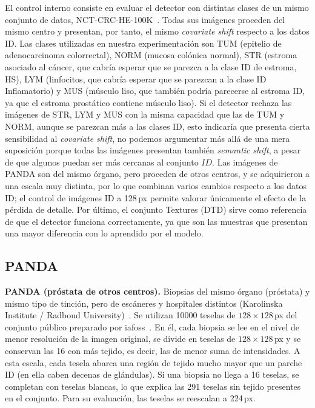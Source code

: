 El control interno consiste en evaluar el detector con distintas clases de un mismo conjunto de datos, NCT-CRC-HE-100K~\cite{kather2019}. Todas sus imágenes proceden del mismo centro y presentan, por tanto, el mismo \emph{covariate shift} respecto a los datos ID. Las clases utilizadas en nuestra experimentación son TUM (epitelio de adenocarcinoma colorrectal), 
NORM (mucosa colónica normal), STR (estroma asociado al cáncer, que cabría esperar que se parezca a la clase ID de estroma, HS), LYM (linfocitos, que cabría esperar que se parezcan 
a la clase ID Inflamatorio) y MUS (músculo liso, que también podría parecerse al estroma ID, ya que el estroma prostático contiene músculo liso). Si el detector rechaza las imágenes de STR, LYM y MUS con la misma capacidad que las de TUM y NORM, aunque se parezcan más a las clases ID, esto indicaría
que presenta cierta sensibilidad al \emph{covariate shift}, no podemos argumentar más allá de una mera suposición porque todas las imágenes presentan también \emph{semantic shift}, a pesar de que algunos puedan ser más cercanas al conjunto $ID$. Las imágenes de PANDA son del mismo órgano, pero proceden de otros centros, y se adquirieron a una escala muy distinta, por lo que combinan varios cambios respecto a los datos ID; el control de imágenes ID a 128\,px permite valorar únicamente 
el efecto de la pérdida de detalle. Por último, el conjunto Textures (DTD) sirve como referencia de que el detector funciona correctamente, ya que son las muestras que presentan una mayor diferencia con lo aprendido por el modelo.


\subsection{PANDA}\label{sec:panda}
\textbf{PANDA (próstata de otros centros).} Biopsias del mismo órgano (próstata) y mismo tipo de tinción, pero de escáneres y hospitales distintos (Karolinska Institute / Radboud University)~\cite{bulten2022}. Se utilizan \num{10000} teselas de $128 \times 128$\,px del conjunto público preparado por iafoss~\cite{kagglepanda128}. En él, cada biopsia se lee en el nivel de menor resolución de la imagen original, se divide en teselas de $128 \times 128$\,px y se conservan las 16 con más tejido, es decir, las de menor suma de intensidades. A esta escala, cada tesela abarca una región de tejido mucho mayor que un parche ID (en ella caben decenas de glándulas). Si una biopsia no llega a 16 teselas, se completan con teselas blancas, lo que explica las 291 teselas sin tejido presentes en el conjunto. Para su evaluación, las teselas se reescalan a 224\,px.

